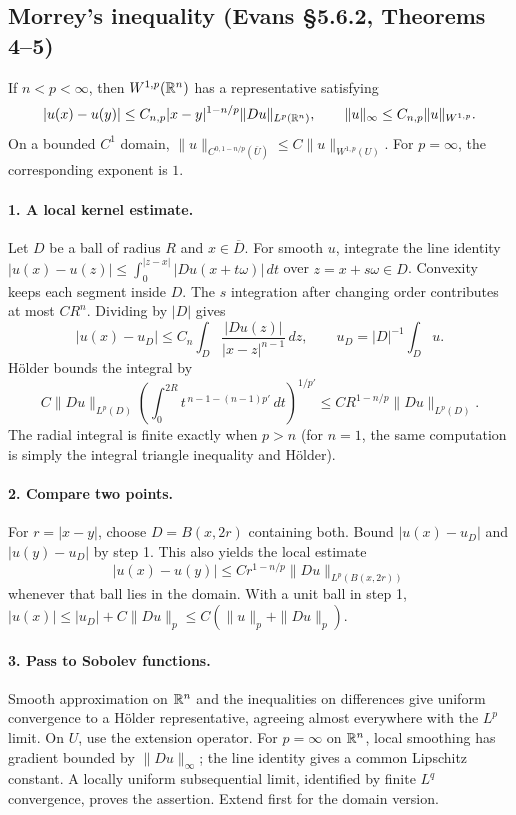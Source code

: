 \subsection{Morrey's inequality (Evans \S5.6.2, Theorems 4--5)}
\begin{theorem}\label{thm:5-morrey}
If $n<p<\infty$, then $W^{1,p}(\mathbb{R}^n)$ has a representative satisfying
\[
 |u(x)-u(y)|\leq C_{n,p}|x-y|^{1-n/p}\|Du\|_{L^p(\mathbb{R}^n)},
 \qquad \|u\|_\infty\leq C_{n,p}\|u\|_{W^{1,p}}.
\]
On a bounded $C^1$ domain,
$\|u\|_{C^{0,1-n/p}(\overline U)}\leq C\|u\|_{W^{1,p}(U)}$.
For $p=\infty$, the corresponding exponent is $1$.
\end{theorem}
\begin{expandedproof}
\paragraph{1. A local kernel estimate.}
Let $D$ be a ball of radius $R$ and $x\in\overline D$. For smooth $u$,
integrate the line identity
$|u(x)-u(z)|\leq\int_0^{|z-x|}|Du(x+t\omega)|\,dt$
over $z=x+s\omega\in D$. Convexity keeps each segment inside $D$.
The $s$ integration after changing order contributes at most $C R^n$.
Dividing by $|D|$ gives
\[
 |u(x)-u_D|\leq C_n\int_D\frac{|Du(z)|}{|x-z|^{n-1}}\,dz,
 \qquad u_D=|D|^{-1}\int_Du.
\]
H\"older bounds the integral by
\[
 C\|Du\|_{L^p(D)}
 \left(\int_0^{2R}t^{\,n-1-(n-1)p'}\,dt\right)^{1/p'}
 \leq C R^{1-n/p}\|Du\|_{L^p(D)}.
\]
The radial integral is finite exactly when $p>n$ (for $n=1$, the
same computation is simply the integral triangle inequality and H\"older).

\paragraph{2. Compare two points.}
For $r=|x-y|$, choose $D=B(x,2r)$ containing both.
Bound $|u(x)-u_D|$ and $|u(y)-u_D|$ by step 1.
This also yields the local estimate
\[
 |u(x)-u(y)|\leq C r^{1-n/p}\|Du\|_{L^p(B(x,2r))}
\]
whenever that ball lies in the domain.
With a unit ball in step 1,
$|u(x)|\leq|u_D|+C\|Du\|_p\leq C(\|u\|_p+\|Du\|_p)$.

\paragraph{3. Pass to Sobolev functions.}
Smooth approximation on $\mathbb{R}^n$ and the inequalities on differences
give uniform convergence to a H\"older representative, agreeing almost
everywhere with the $L^p$ limit. On $U$, use the extension operator.
For $p=\infty$ on $\mathbb{R}^n$, local smoothing has gradient bounded by
$\|Du\|_\infty$; the line identity gives a common Lipschitz constant.
A locally uniform subsequential limit, identified by finite $L^q$
convergence, proves the assertion. Extend first for the domain version.
\end{expandedproof}
\Needspace{45mm}

